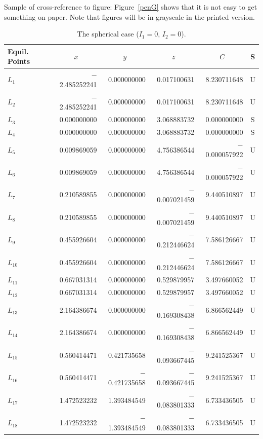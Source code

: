 \documentclass[ecta,nameyear,final,supplement]{econsocart}
\theoremstyle{plain}
\theoremstyle{definition}
\begin{document}
Sample of cross-reference to figure: Figure~\ref{penG} shows that it is not easy to get something on paper. Note that figures will be in grayscale in the printed version.
\begin{table}
\caption{The spherical case ($I_1=0$, $I_2=0$).}
\label{sphericcase}
\begin{tabular}{@{}lrrrrc@{}@{}}
\hline
Equil. Points
& \multicolumn{1}{c}{$x$}
& \multicolumn{1}{c}{$y$}
& \multicolumn{1}{c}{$z$}
& \multicolumn{1}{c}{$C$}
& S \\
\hline
$L_1$    & $-$2.485252241 & 0.000000000    & 0.017100631    & 8.230711648    & U \\
$L_2$    & $-$2.485252241 & 0.000000000    & 0.017100631    & 8.230711648    & U \\
$L_3$    & 0.000000000    & 0.000000000    & 3.068883732    & 0.000000000    & S \\
$L_4$    & 0.000000000    & 0.000000000    & 3.068883732    & 0.000000000    & S \\
$L_5$    & 0.009869059    & 0.000000000    & 4.756386544    & $-$0.000057922 & U \\
$L_6$    & 0.009869059    & 0.000000000    & 4.756386544    & $-$0.000057922 & U \\
$L_7$    & 0.210589855    & 0.000000000    & $-$0.007021459 & 9.440510897    & U \\
$L_8$    & 0.210589855    & 0.000000000    & $-$0.007021459 & 9.440510897    & U \\
$L_9$    & 0.455926604    & 0.000000000    & $-$0.212446624 & 7.586126667    & U \\
$L_{10}$    & 0.455926604    & 0.000000000    & $-$0.212446624 & 7.586126667    & U \\
$L_{11}$    & 0.667031314    & 0.000000000    & 0.529879957    & 3.497660052    & U \\
$L_{12}$    & 0.667031314    & 0.000000000    & 0.529879957    & 3.497660052    & U \\
$L_{13}$    & 2.164386674    & 0.000000000    & $-$0.169308438 & 6.866562449    & U \\
$L_{14}$    & 2.164386674    & 0.000000000    & $-$0.169308438 & 6.866562449    & U \\
$L_{15}$    & 0.560414471    & 0.421735658    & $-$0.093667445 & 9.241525367    & U \\
$L_{16}$    & 0.560414471    & $-$0.421735658 & $-$0.093667445 & 9.241525367    & U \\
$L_{17}$ & 1.472523232    & 1.393484549    & $-$0.083801333 & 6.733436505    & U \\
$L_{18}$ & 1.472523232    & $-$1.393484549 & $-$0.083801333 & 6.733436505    & U \\
\hline
\end{tabular}

\end{table}
\end{document}

